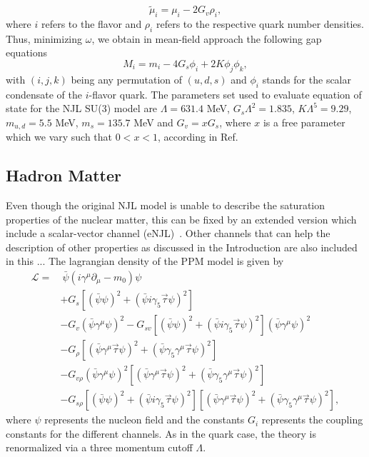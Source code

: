 \documentclass[prc, reprint, amsmath, floatfix,10pt]{revtex4-1}
\begin{document}
\begin{equation}
\widetilde{\mu}_i=\mu_i-2G_v\rho_i,
\end{equation}
where $i$ refers to the flavor and $\rho_i$ refers to the respective quark number densities. Thus,
minimizing $\omega$, we obtain in mean-field approach the following gap equations
\begin{equation}
M_i=m_i-4G_s\phi_i+2K\phi_j\phi_k,
\end{equation}
with $(i,j,k)$ being any permutation of $(u,d,s)$ and $\phi_i$ 
stands for the scalar condensate of the $i$-flavor quark.
The parameters set used to evaluate equation of state for the NJL SU(3) model are
$\Lambda=631.4$ MeV, $G_s\Lambda^2=1.835$, $K\Lambda^5=9.29$, $m_{u,d}=5.5$ MeV, $m_s=135.7$ MeV
and $G_v=xG_s$, where $x$ is a free parameter which we vary such that $0<x<1$, according in Ref. \cite{PhysRevD.64.043005} 

\subsection{Hadron Matter}\label{NJLHM}

Even though the original NJL model is unable to describe the saturation properties of the nuclear matter, this can be fixed by an extended version which include a scalar-vector channel (eNJL)~\cite{Koch1987}. Other channels that can help the description of other properties as discussed in the Introduction are also included in this ... The lagrangian density of the PPM model is given by~\cite{Pais2016}
\begin{equation}\label{Eq:Lagrangiana_eNLJ_Pais}
\begin{split}
	\mathscr{L} =&~ \bar{\psi}(i\gamma^\mu\partial_\mu - m_0)\psi \\
	& + G_s[(\bar{\psi}\psi)^2 + (\bar{\psi}i\gamma_5\vec{\tau}\psi)^2] \\
	& - G_v(\bar{\psi}\gamma^\mu\psi)^2 - G_{sv}[(\bar{\psi}\psi)^2 + (\bar{\psi}i\gamma_5\vec{\tau}\psi)^2](\bar{\psi}\gamma^\mu\psi)^2 \\
	& - G_\rho[(\bar{\psi}\gamma^\mu\vec{\tau}\psi)^2 + (\bar{\psi}\gamma_5\gamma^\mu\vec{\tau}\psi)^2] \\
	& - G_{v\rho}(\bar{\psi}\gamma^\mu\psi)^2[(\bar{\psi}\gamma^\mu\vec{\tau}\psi)^2 + (\bar{\psi}\gamma_5\gamma^\mu\vec{\tau}\psi)^2] \\
	& - G_{s\rho} [(\bar{\psi}\psi)^2 + (\bar{\psi}i\gamma_5\vec{\tau}\psi)^2][(\bar{\psi}\gamma^\mu\vec{\tau}\psi)^2 + (\bar{\psi}\gamma_5\gamma^\mu\vec{\tau}\psi)^2],
\end{split}
\end{equation}
%
where $\psi$ represents the nucleon field and the constants $G_i$ represents the coupling constants for the different channels. As in the quark case, the theory is renormalized via a three momentum cutoff $\Lambda$.
\end{document}
